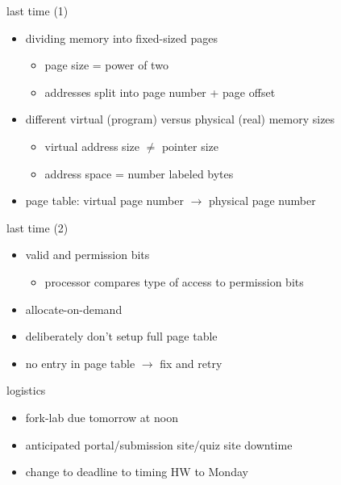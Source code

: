 \date{}
\title{}
\date{}

\begin{frame}
    \titlepage
\end{frame}





\begin{frame}{last time (1)}
    \begin{itemize}
    \item dividing memory into fixed-sized pages
        \begin{itemize}
        \item page size = power of two
        \item addresses split into page number + page offset
        \end{itemize}
    \item different virtual (program) versus physical (real) memory sizes
        \begin{itemize}
        \item virtual address size $\not=$ pointer size
        \item address space = number labeled bytes
        \end{itemize}
    \item page table: virtual page number $\rightarrow$ physical page number
    \end{itemize}
\end{frame}

\begin{frame}{last time (2)}
    \begin{itemize}
    \item valid and permission bits
        \begin{itemize}
        \item processor compares type of access to permission bits
        \end{itemize}
    \vspace{.5cm}
    \item allocate-on-demand
    \item deliberately don't setup full page table
    \item no entry in page table $\rightarrow$ fix and retry
    \end{itemize}
\end{frame}

\begin{frame}{logistics}
    \begin{itemize}
    \item fork-lab due tomorrow at noon
    \item anticipated portal/submission site/quiz site downtime
    \item change to deadline to timing HW to Monday
    \end{itemize}
\end{frame}


